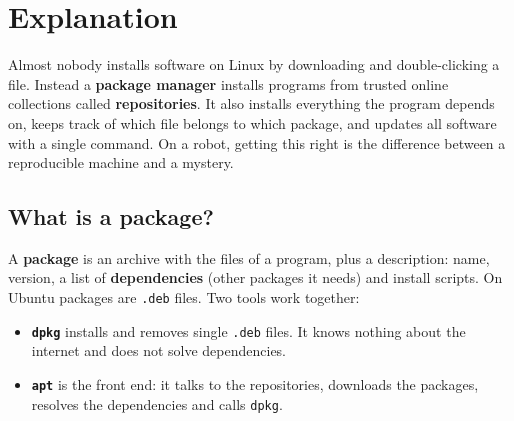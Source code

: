 \label{ch:linux4}

\section*{Explanation}
Almost nobody installs software on Linux by downloading and double-clicking a file. Instead a \textbf{package manager} installs programs from trusted online collections called \textbf{repositories}. It also installs everything the program depends on, keeps track of which file belongs to which package, and updates all software with a single command. On a robot, getting this right is the difference between a reproducible machine and a mystery.

\subsection*{What is a package?}
A \textbf{package} is an archive with the files of a program, plus a description: name, version, a list of \textbf{dependencies} (other packages it needs) and install scripts. On Ubuntu packages are \texttt{.deb} files. Two tools work together:
\begin{itemize}[nosep]
  \item \textbf{\texttt{dpkg}} installs and removes single \texttt{.deb} files. It knows nothing about the internet and does not solve dependencies.
  \item \textbf{\texttt{apt}} is the front end: it talks to the repositories, downloads the packages, resolves the dependencies and calls \texttt{dpkg}.
\end{itemize}

\begin{center}
\label{fig:l4_apt}
\end{center}

